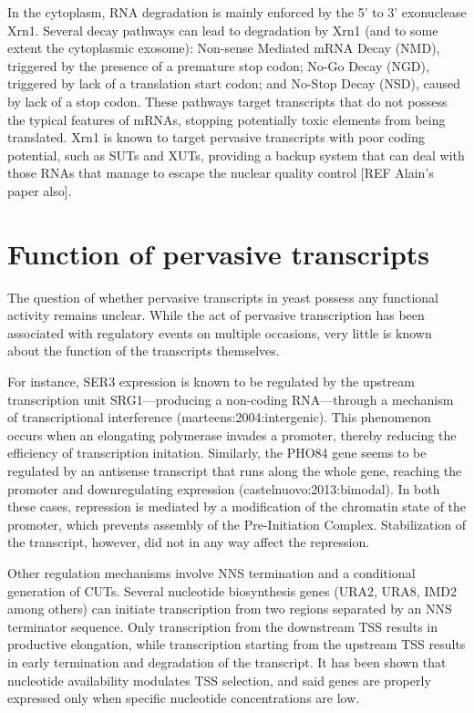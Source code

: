 In the cytoplasm, RNA degradation is mainly enforced by the 5' to 3' exonuclease Xrn1. 
Several decay pathways can lead to degradation by Xrn1 (and to some extent the cytoplasmic exosome): Non-sense Mediated mRNA Decay (NMD), triggered by the presence of a premature stop codon; No-Go Decay (NGD), triggered by lack of a translation start codon; and No-Stop Decay (NSD), caused by lack of a stop codon.
These pathways target transcripts that do not possess the typical features of mRNAs, stopping potentially toxic elements from being translated. 
Xrn1 is known to target pervasive transcripts with poor coding potential, such as SUTs and XUTs, providing a backup system that can deal with those RNAs that manage to escape the nuclear quality control [REF Alain’s paper also].

\section{Function of pervasive transcripts}

The question of whether pervasive transcripts in yeast possess any functional activity remains unclear.
While the act of pervasive transcription has been associated with regulatory events on multiple occasions, very little is known about the function of the transcripts themselves. 

For instance, SER3 expression is known to be regulated by the upstream transcription unit SRG1—producing a non-coding RNA—through a mechanism of transcriptional interference (marteens:2004:intergenic). 
This phenomenon occurs when an elongating polymerase invades a promoter, thereby reducing the efficiency of transcription initation. Similarly, the PHO84 gene seems to be regulated by an antisense transcript that runs along the whole gene, reaching the promoter and downregulating expression (castelnuovo:2013:bimodal). 
In both these cases, repression is mediated by a modification of the chromatin state of the promoter, which prevents assembly of the Pre-Initiation Complex. Stabilization of the transcript, however, did not in any way affect the repression.

Other regulation mechanisms involve NNS termination and a conditional generation of CUTs. Several nucleotide biosynthesis genes (URA2, URA8, IMD2 among others) can initiate transcription from two regions separated by an NNS terminator sequence. %
Only transcription from the downstream TSS results in productive elongation, while transcription starting from the upstream TSS results in early termination and degradation of the transcript. 
It has been shown that nucleotide availability modulates TSS selection, and said genes are properly expressed only when specific nucleotide concentrations are low.


\clearpage




